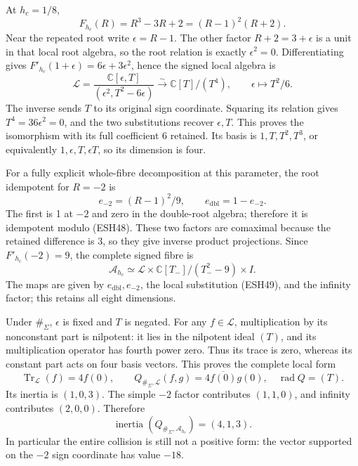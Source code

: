 \documentclass[
  10pt,
  a4paper,
]{article}
\begin{document}
At \(h_c=1/8\), \[
F_{h_c}(R)=R^3-3R+2=(R-1)^2(R+2).
\tag{ESH48}
\] Near the repeated root write \(\epsilon=R-1\). The other factor
\(R+2=3+\epsilon\) is a unit in that local root algebra, so the root
relation is exactly \(\epsilon^2=0\). Differentiating gives
\(F'_{h_c}(1+\epsilon)=6\epsilon+3\epsilon^2\), hence the signed local
algebra is \[
\mathcal L=
\frac{\mathbb C[\epsilon,T]}{(\epsilon^2,T^2-6\epsilon)}
\xrightarrow{\sim}\mathbb C[T]/(T^4),
\qquad \epsilon\longmapsto T^2/6.
\tag{ESH49}
\] The inverse sends \(T\) to its original sign coordinate. Squaring its
relation gives \(T^4=36\epsilon^2=0\), and the two substitutions recover
\(\epsilon,T\). This proves the isomorphism with its full coefficient 6
retained. Its basis is \(1,T,T^2,T^3\), or equivalently
\(1,\epsilon,T,\epsilon T\), so its dimension is four.

For a fully explicit whole-fibre decomposition at this parameter, the
root idempotent for \(R=-2\) is \[
e_{-2}=(R-1)^2/9,\qquad e_{\mathrm{dbl}}=1-e_{-2}.
\tag{ESH50}
\] The first is 1 at \(-2\) and zero in the double-root algebra;
therefore it is idempotent modulo (ESH48). These two factors are
comaximal because the retained difference is 3, so they give inverse
product projections. Since \(F'_{h_c}(-2)=9\), the complete signed fibre
is \[
\mathcal A_{h_c}\simeq
\mathcal L\times\mathbb C[T_-]/(T_-^2-9)\times I.
\tag{ESH51}
\] The maps are given by \(e_{\mathrm{dbl}},e_{-2}\), the local
substitution (ESH49), and the infinity factor; this retains all eight
dimensions.

Under \(\#_\Sigma\), \(\epsilon\) is fixed and \(T\) is negated. For any
\(f\in\mathcal L\), multiplication by its nonconstant part is nilpotent:
it lies in the nilpotent ideal \((T)\), and its multiplication operator
has fourth power zero. Thus its trace is zero, whereas its constant part
acts on four basis vectors. This proves the complete local form \[
\operatorname{Tr}_{\mathcal L}(f)=4f(0),\qquad
Q_{\#_\Sigma,\mathcal L}(f,g)=4\overline{f(0)}g(0),
\quad\operatorname{rad}Q=(T).
\tag{ESH52}
\] Its inertia is \((1,0,3)\). The simple \(-2\) factor contributes
\((1,1,0)\), and infinity contributes \((2,0,0)\). Therefore \[
\boxed{\operatorname{inertia}(Q_{\#_\Sigma,\mathcal A_{h_c}})=(4,1,3).}
\tag{ESH53}
\] In particular the entire collision is still not a positive form: the
vector supported on the \(-2\) sign coordinate has value \(-18\).
\end{document}
